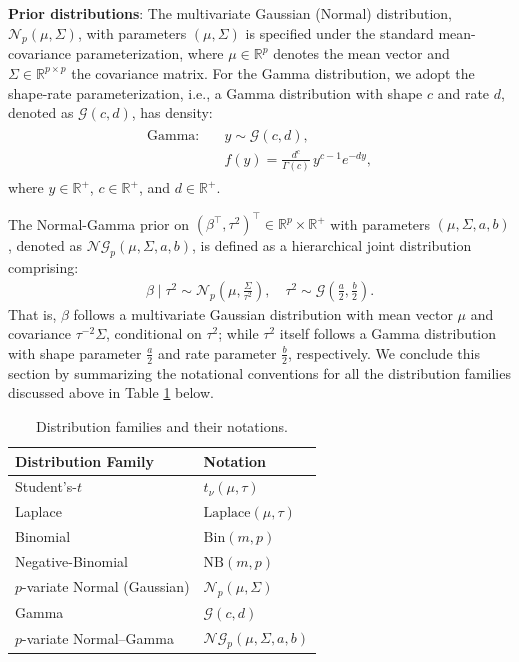 \documentclass[12pt]{article}
\numberwithin{equation}{section}
\begin{document}
\textbf{Prior distributions}: The multivariate Gaussian (Normal) distribution, $\mathcal{N}_p(\mu, \Sigma)$, with parameters $(\mu, \Sigma)$ is specified under the standard mean-covariance parameterization, where $\mu \in \mathbb{R}^{p}$ denotes the mean vector and $\Sigma \in \mathbb{R}^{p\times p}$ the covariance matrix. For the Gamma distribution, we adopt the shape-rate parameterization, i.e., a Gamma distribution with shape $c$ and rate $d$, denoted as $\mathcal{G}(c, d)$, has density:
%
\begin{align}
\label{eq:param-gamma}
\begin{split}
\text{Gamma:} \quad &y\sim \mathcal{G}(c, d),\\ 
&f(y) = \frac{d^{c}}{\Gamma(c)}\, y^{c - 1} e^{-d y},
\end{split}
\end{align}
where $y \in \mathbb{R}^{+}$, $c \in \mathbb{R}^{+}$, and $d \in \mathbb{R}^{+}$.
%

The Normal-Gamma prior on $(\beta^{\top}, \tau^2)^{\top} \in \mathbb{R}^{p}\times \mathbb{R}^{+}$ with parameters $(\mu, \Sigma, a, b)$, denoted as $\mathcal{NG}_{p}(\mu, \Sigma,a,b)$, is defined as a hierarchical joint distribution comprising:
\begin{align}\label{eq:param-normal-gamma}
    \beta\mid \tau^{2} \sim \mathcal{N}_p\left(\mu, \tfrac{\Sigma}{\tau^2}\right), \quad \tau^{2}\sim \mathcal{G}\left(\tfrac{a}{2}, \tfrac{b}{2}\right).
\end{align}
That is, $\beta$ follows a multivariate Gaussian distribution with mean vector $\mu$ and covariance $\tau^{-2}\Sigma$, conditional on $\tau^2$; while $\tau^{2}$ itself follows a Gamma distribution with shape parameter $\tfrac{a}{2}$ and rate parameter $\tfrac{b}{2}$, respectively. We conclude this section by summarizing the notational conventions for all the distribution families discussed above in Table \ref{tab:distributions} below.
%
\begin{table}[H]
\centering
\begin{tabular}{ll}
\hline
\hline
\textbf{Distribution Family} & \textbf{Notation} \\
\hline
Student's-$t$ & $t_{\nu}(\mu, \tau)$ \\[4pt]
Laplace & $\mathrm{Laplace}(\mu, \tau)$ \\[4pt]
Binomial & $\mathrm{Bin}(m, p)$ \\[4pt]
Negative-Binomial & $\mathrm{NB}(m, p)$ \\[4pt]
$p$-variate Normal (Gaussian) & $\mathcal{N}_p(\mu, \Sigma)$ \\[4pt]
Gamma & $\mathcal{G}(c, d)$ \\[4pt]
$p$-variate Normal–Gamma & $\mathcal{NG}_p(\mu, \Sigma, a, b)$ \\
\hline
\hline
\end{tabular}
\caption{Distribution families and their notations.}
\label{tab:distributions}
\end{table}
%
\end{document}
